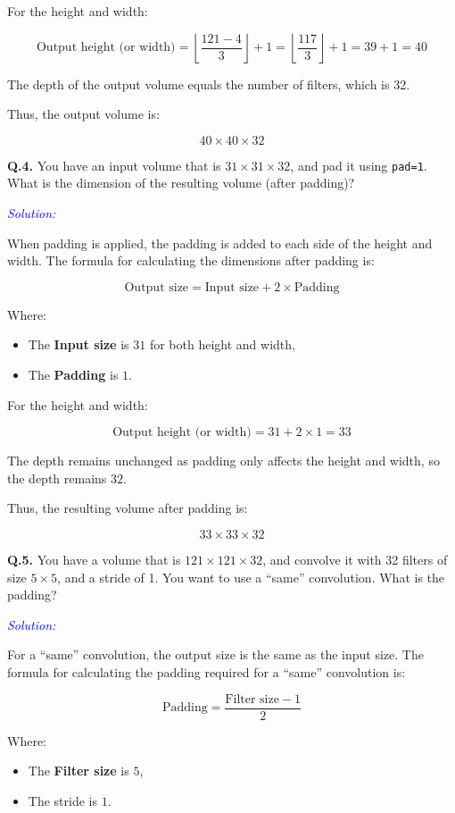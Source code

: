 \documentclass[letterpaper,12pt,notitlepage,twoside]{report}
\begin{document}
For the height and width:

\[
\text{Output height (or width)} = \left\lfloor \frac{121 - 4}{3} \right\rfloor + 1 = \left\lfloor \frac{117}{3} \right\rfloor + 1 = 39 + 1 = 40
\]

The depth of the output volume equals the number of filters, which is 32.

Thus, the output volume is:

\[
40 \times 40 \times 32
\]

\textbf{Q.4.} You have an input volume that is \( 31 \times 31 \times 32 \), and pad it using \texttt{pad=1}. What is the dimension of the resulting volume (after padding)?

\textcolor{blue}{\textit{Solution:}}

When padding is applied, the padding is added to each side of the height and width. The formula for calculating the dimensions after padding is:

\[
\text{Output size} = \text{Input size} + 2 \times \text{Padding}
\]

Where:
\begin{itemize}
    \item The \textbf{Input size} is \( 31 \) for both height and width,
    \item The \textbf{Padding} is \( 1 \).
\end{itemize}

For the height and width:

\[
\text{Output height (or width)} = 31 + 2 \times 1 = 33
\]

The depth remains unchanged as padding only affects the height and width, so the depth remains \( 32 \).

Thus, the resulting volume after padding is:

\[
33 \times 33 \times 32
\]

\textbf{Q.5.} You have a volume that is \( 121 \times 121 \times 32 \), and convolve it with 32 filters of size \( 5 \times 5 \), and a stride of 1. You want to use a ``same'' convolution. What is the padding?

\textcolor{blue}{\textit{Solution:}}

For a ``same'' convolution, the output size is the same as the input size. The formula for calculating the padding required for a ``same'' convolution is:

\[
\text{Padding} = \frac{\text{Filter size} - 1}{2}
\]

Where:
\begin{itemize}
    \item The \textbf{Filter size} is \( 5 \),
    \item The stride is \( 1 \).
\end{itemize}
\end{document}
